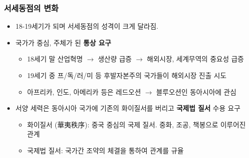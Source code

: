 \subsubsection*{서세동점의 변화}
\begin{itemize}
    \item 18-19세기가 되며 서세동점의 성격이 크게 달라짐.
    \item 국가가 중심, 주체가 된 \textbf{통상 요구}
    \begin{itemize}
        \item 18세기 말 산업혁명 $\rightarrow$ 생산량 급증 $\rightarrow$ 해외시장, 세계무역의 중요성 급증
        \item 19세기 중 프/독/러/미 등 후발자본주의 국가들이 해외시장 진출 시도
        \item 아프리카, 인도, 아메리카 등은 레드오션 $\rightarrow$ 블루오션인 동아시아에 관심
    \end{itemize}
    \item 서양 세력은 동아시아 국가에 기존의 화이질서를 버리고 \textbf{국제법 질서} 수용 요구
    \begin{itemize}
        \item 화이질서 (華夷秩序): 중국 중심의 국제 질서. 중화, 조공, 책봉으로 이루어진 관계
        \item 국제법 질서: 국가간 조약의 체결을 통하여 관계를 규율
    \end{itemize}
\end{itemize}

